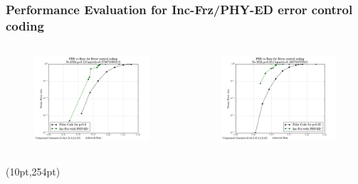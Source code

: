 \documentclass[xcolor=dvipsnames]{beamer}
\newcommand\hyperback[1]{%
  \begin{textblock*}{\paperwidth}(10pt,254pt)
    \raggedright #1\hspace{.5em}
  \end{textblock*}}
\begin{document}
\begin{frame}[label=pch2]
\frametitle{Performance Evaluation for Inc-Frz/PHY-ED error control coding}
\begin{minipage}[1.1\textheight]{\textwidth}
\begin{columns}
\begin{column}{0.5\textwidth}
\begin{figure}
\centering
\includegraphics[width=6cm]{./FER_channel0p2.png}
\end{figure}
\end{column}
\begin{column}{0.5\textwidth}
\begin{figure}
\centering
\includegraphics[width=6cm]{./FER_channel0p25.png}
\end{figure}
\end{column}
\end{columns}
\end{minipage}
\hyperback{\hyperlink{psw2}{}}
\end{frame}
\end{document}
